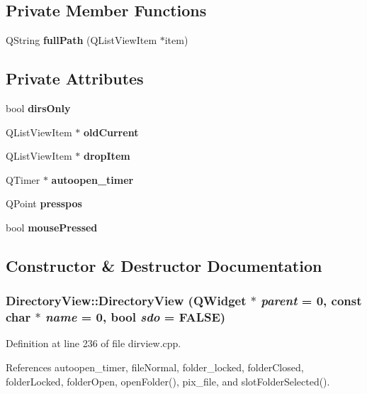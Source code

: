 \subsection*{Private Member Functions}
\begin{CompactItemize}
\item 
QString {\bf full\-Path} (QList\-View\-Item $\ast$item)
\end{CompactItemize}
\subsection*{Private Attributes}
\begin{CompactItemize}
\item 
bool {\bf dirs\-Only}
\item 
QList\-View\-Item $\ast$ {\bf old\-Current}
\item 
QList\-View\-Item $\ast$ {\bf drop\-Item}
\item 
QTimer $\ast$ {\bf autoopen\_\-timer}
\item 
QPoint {\bf presspos}
\item 
bool {\bf mouse\-Pressed}
\end{CompactItemize}


\subsection{Constructor \& Destructor Documentation}
\subsubsection{\setlength{\rightskip}{0pt plus 5cm}Directory\-View::Directory\-View ({\bf QWidget} $\ast$ {\em parent} = 0, const char $\ast$ {\em name} = 0, bool {\em sdo} = FALSE)}\label{classDirectoryView_DirectoryViewa0}




Definition at line 236 of file dirview.cpp.

References autoopen\_\-timer, file\-Normal, folder\_\-locked, folder\-Closed, folder\-Locked, folder\-Open, open\-Folder(), pix\_\-file, and slot\-Folder\-Selected().



